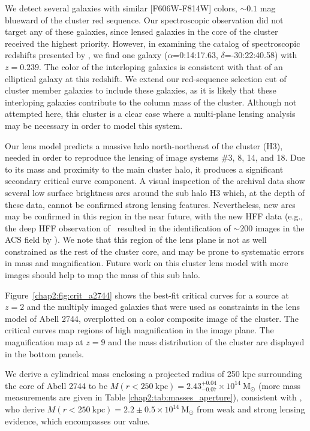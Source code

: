 We detect several galaxies with similar [F606W-F814W] colors, $\sim0.1$ mag blueward of the cluster red sequence. Our spectroscopic observation did not target any of these galaxies, since lensed galaxies in the core of the cluster received the highest priority. However, in examining the catalog of spectroscopic redshifts presented by \citet{Owers:2011rr}, we find one galaxy ($\alpha$=0:14:17.63, $\delta$=-30:22:40.58) with $z=0.239$. The color of the interloping galaxies is consistent with that of an elliptical galaxy at this redshift. We extend our red-sequence selection cut of cluster member galaxies to include these galaxies, as it is likely that these interloping galaxies contribute to the column mass of the cluster. Although not attempted here, this cluster is a clear case where a multi-plane lensing analysis may be necessary \citep[e.g., ][]{McCully:2014lr,Bayliss:2014fk,DAloisio:2013ul} in order to model this system.

Our lens model predicts a massive halo north-northeast of the cluster (H3), needed in order to reproduce the lensing of image systems \#3, 8, 14, and 18. Due to its mass and proximity to the main cluster halo, it produces a significant secondary critical curve component.  A visual inspection of the archival data show several low surface brightness arcs around the sub halo H3 which, at the depth of these data, cannot be confirmed strong lensing features. Nevertheless, new arcs may be confirmed in this region in the near future, with the new HFF data (e.g., the deep HFF observation of \MACSzerofour\ resulted in the identification of  $\sim200$ images in the ACS field by \citealt{Jauzac:2014qd}). We note that this region of the lens plane is not as well constrained as the rest of the cluster core, and may be prone to systematic errors in mass and magnification. Future work on this cluster lens model with more images should help to map the mass of this sub halo.

Figure~\ref{chap2:fig:crit_a2744} shows the best-fit critical curves for a source at $z=2$ and the multiply imaged galaxies that were used as constraints in the lens model of Abell 2744, overplotted on a color composite image of the cluster. The critical curves map regions of high magnification in the image plane. The magnification map at $z=9$ and the mass distribution of the cluster are displayed in the bottom panels.

We derive a cylindrical mass enclosing a projected radius of 250 kpc surrounding the core of Abell 2744 to be $M(r<250\ \mathrm{kpc})=2.43^{+0.04}_{-0.07}\times10^{14}\ \mathrm{M_\odot}$ (more mass measurements are given in Table \ref{chap2:tab:masses_aperture}), consistent with \citet{Merten:2011fk}, who derive $M(r<250\ \mathrm{kpc})=2.2\pm0.5\times10^{14}\ \mathrm{M_\odot}$ from weak and strong lensing evidence, which encompasses our value.

